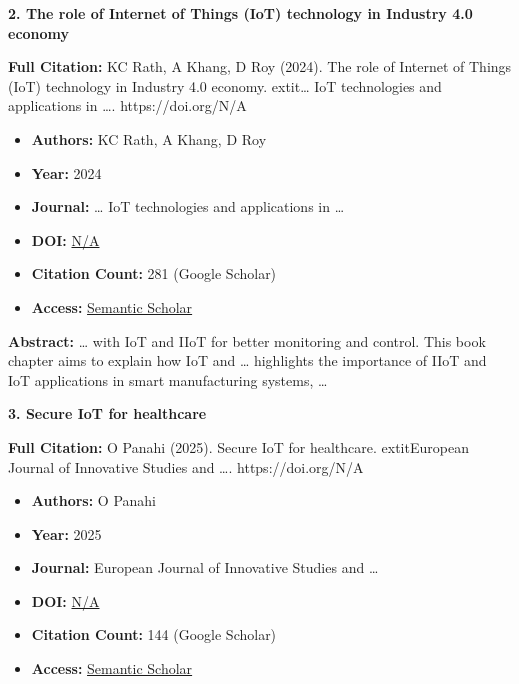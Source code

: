 \documentclass[11pt,a4paper]{article}
\begin{document}
\textbf{2. The role of Internet of Things (IoT) technology in Industry 4.0 economy}

\textbf{Full Citation:} KC Rath, A Khang, D Roy (2024). The role of Internet of Things (IoT) technology in Industry 4.0 economy. 	extit{… IoT technologies and applications in …}. https://doi.org/N/A

\begin{resultbox}
\begin{itemize}[leftmargin=*]
    \item \textbf{Authors:} KC Rath, A Khang, D Roy
    \item \textbf{Year:} 2024
    \item \textbf{Journal:} … IoT technologies and applications in …
    
    
    
    \item \textbf{DOI:} \href{https://doi.org/}{N/A}
    \item \textbf{Citation Count:} 281 (Google Scholar)
    \item \textbf{Access:} \href{https://www.taylorfrancis.com/chapters/edit/10.1201/9781003434269-1/role-internet-things-iot-technology-industry-4-0-economy-kali-charan-rath-alex-khang-debanik-roy}{Semantic Scholar}
\end{itemize}
\end{resultbox}

\textbf{Abstract:} … with IoT and IIoT for better monitoring and control. This book chapter aims to explain how IoT and … highlights the importance of IIoT and IoT applications in smart manufacturing systems, …\par\vspace{0.5em}



\textbf{3. Secure IoT for healthcare}

\textbf{Full Citation:} O Panahi (2025). Secure IoT for healthcare. 	extit{European Journal of Innovative Studies and …}. https://doi.org/N/A

\begin{resultbox}
\begin{itemize}[leftmargin=*]
    \item \textbf{Authors:} O Panahi
    \item \textbf{Year:} 2025
    \item \textbf{Journal:} European Journal of Innovative Studies and …
    
    
    
    \item \textbf{DOI:} \href{https://doi.org/}{N/A}
    \item \textbf{Citation Count:} 144 (Google Scholar)
    \item \textbf{Access:} \href{https://ejiss.com/index.php/journal/article/view/3}{Semantic Scholar}
\end{itemize}
\end{resultbox}
\end{document}
